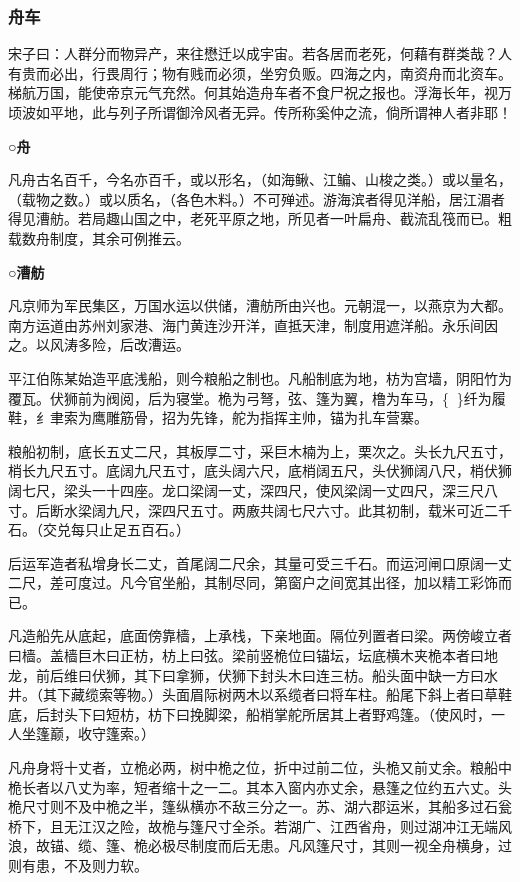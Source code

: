 \documentclass[]{article}
\begin{document}
\hypertarget{header-n2512}{%
\subsubsection{舟车}\label{header-n2512}}

宋子曰：人群分而物异产，来往懋迁以成宇宙。若各居而老死，何藉有群类哉？人有贵而必出，行畏周行；物有贱而必须，坐穷负贩。四海之内，南资舟而北资车。梯航万国，能使帝京元气充然。何其始造舟车者不食尸祝之报也。浮海长年，视万顷波如平地，此与列子所谓御泠风者无异。传所称奚仲之流，倘所谓神人者非耶！

\textbf{○舟}

凡舟古名百千，今名亦百千，或以形名，（如海鳅、江鳊、山梭之类。）或以量名，（载物之数。）或以质名，（各色木料。）不可殚述。游海滨者得见洋船，居江湄者得见漕舫。若局趣山国之中，老死平原之地，所见者一叶扁舟、截流乱筏而已。粗载数舟制度，其余可例推云。

\textbf{○漕舫}

凡京师为军民集区，万国水运以供储，漕舫所由兴也。元朝混一，以燕京为大都。南方运道由苏州刘家港、海门黄连沙开洋，直抵天津，制度用遮洋船。永乐间因之。以风涛多险，后改漕运。

平江伯陈某始造平底浅船，则今粮船之制也。凡船制底为地，枋为宫墙，阴阳竹为覆瓦。伏狮前为阀阅，后为寝堂。桅为弓弩，弦、篷为翼，橹为车马，\{\}纤为履鞋，纟聿索为鹰雕筋骨，招为先锋，舵为指挥主帅，锚为扎车营寨。

粮船初制，底长五丈二尺，其板厚二寸，采巨木楠为上，栗次之。头长九尺五寸，梢长九尺五寸。底阔九尺五寸，底头阔六尺，底梢阔五尺，头伏狮阔八尺，梢伏狮阔七尺，梁头一十四座。龙口梁阔一丈，深四尺，使风梁阔一丈四尺，深三尺八寸。后断水梁阔九尺，深四尺五寸。两廒共阔七尺六寸。此其初制，载米可近二千石。（交兑每只止足五百石。）

后运军造者私增身长二丈，首尾阔二尺余，其量可受三千石。而运河闸口原阔一丈二尺，差可度过。凡今官坐船，其制尽同，第窗户之间宽其出径，加以精工彩饰而已。

凡造船先从底起，底面傍靠樯，上承栈，下亲地面。隔位列置者曰梁。两傍峻立者曰樯。盖樯巨木曰正枋，枋上曰弦。梁前竖桅位曰锚坛，坛底横木夹桅本者曰地龙，前后维曰伏狮，其下曰拿狮，伏狮下封头木曰连三枋。船头面中缺一方曰水井。（其下藏缆索等物。）头面眉际树两木以系缆者曰将车柱。船尾下斜上者曰草鞋底，后封头下曰短枋，枋下曰挽脚梁，船梢掌舵所居其上者野鸡篷。（使风时，一人坐篷巅，收守篷索。）

凡舟身将十丈者，立桅必两，树中桅之位，折中过前二位，头桅又前丈余。粮船中桅长者以八丈为率，短者缩十之一二。其本入窗内亦丈余，悬篷之位约五六丈。头桅尺寸则不及中桅之半，篷纵横亦不敌三分之一。苏、湖六郡运米，其船多过石瓮桥下，且无江汉之险，故桅与篷尺寸全杀。若湖广、江西省舟，则过湖冲江无端风浪，故锚、缆、篷、桅必极尽制度而后无患。凡风篷尺寸，其则一视全舟横身，过则有患，不及则力软。
\end{document}
